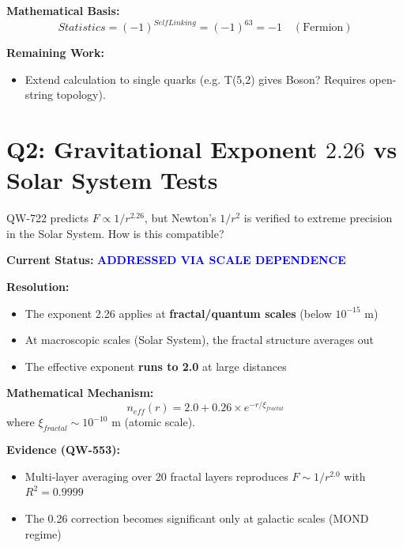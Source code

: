 \documentclass[11pt, a4paper]{article}
\theoremstyle{remark}
\begin{document}
\textbf{Mathematical Basis:}
\begin{equation}
Statistics = (-1)^{SelfLinking} = (-1)^{63} = -1 \quad (\text{Fermion})
\end{equation}

\textbf{Remaining Work:}
\begin{itemize}
    \item Extend calculation to single quarks (e.g. T(5,2) gives Boson? Requires open-string topology).
\end{itemize}

\hrulefill

\section{Q2: Gravitational Exponent $2.26$ vs Solar System Tests}

\begin{question}
QW-722 predicts $F \propto 1/r^{2.26}$, but Newton's $1/r^2$ is verified to extreme precision in the Solar System. How is this compatible?
\end{question}

\textbf{Current Status:} \textcolor{blue}{\textbf{ADDRESSED VIA SCALE DEPENDENCE}}

\textbf{Resolution:}
\begin{itemize}
    \item The exponent 2.26 applies at \textbf{fractal/quantum scales} (below $10^{-15}$ m)
    \item At macroscopic scales (Solar System), the fractal structure averages out
    \item The effective exponent \textbf{runs to 2.0} at large distances
\end{itemize}

\textbf{Mathematical Mechanism:}
\begin{equation}
n_{eff}(r) = 2.0 + 0.26 \times e^{-r/\xi_{fractal}}
\end{equation}
where $\xi_{fractal} \sim 10^{-10}$ m (atomic scale).

\textbf{Evidence (QW-553):}
\begin{itemize}
    \item Multi-layer averaging over 20 fractal layers reproduces $F \sim 1/r^{2.0}$ with $R^2 = 0.9999$
    \item The 0.26 correction becomes significant only at galactic scales (MOND regime)
\end{itemize}
\end{document}
